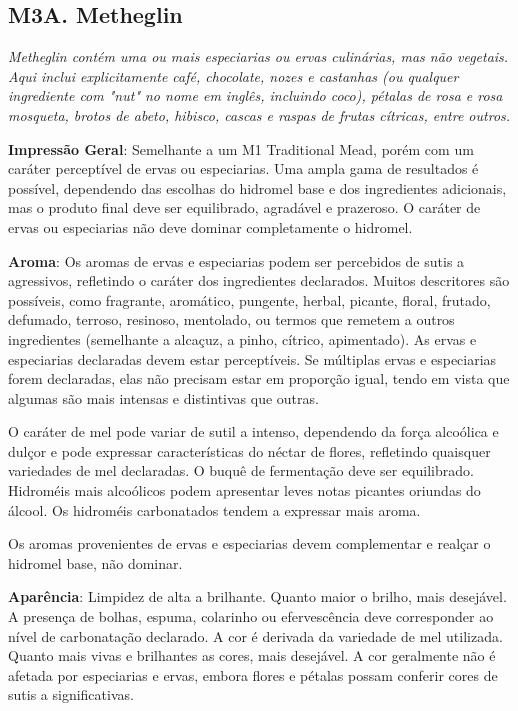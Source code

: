 \subsection*{M3A. Metheglin}

\textit{Metheglin contém uma ou mais especiarias ou ervas culinárias, mas não vegetais. Aqui inclui explicitamente café, chocolate, nozes e castanhas (ou qualquer ingrediente com "nut" no nome em inglês, incluindo coco), pétalas de rosa e rosa mosqueta, brotos de abeto, hibisco, cascas e raspas de frutas cítricas, entre outros.}

\textbf{Impressão Geral}: Semelhante a um M1 Traditional Mead, porém com um caráter perceptível de ervas ou especiarias. Uma ampla gama de resultados é possível, dependendo das escolhas do hidromel base e dos ingredientes adicionais, mas o produto final deve ser equilibrado, agradável e prazeroso. O caráter de ervas ou especiarias não deve dominar completamente o hidromel.

\textbf{Aroma}: Os aromas de ervas e especiarias podem ser percebidos de sutis a agressivos, refletindo o caráter dos ingredientes declarados. Muitos descritores são possíveis, como fragrante, aromático, pungente, herbal, picante, floral, frutado, defumado, terroso, resinoso, mentolado, ou termos que remetem a outros ingredientes (semelhante a alcaçuz, a pinho, cítrico, apimentado). As ervas e especiarias declaradas devem estar perceptíveis. Se múltiplas ervas e especiarias forem declaradas, elas não precisam estar em proporção igual, tendo em vista que algumas são mais intensas e distintivas que outras.

O caráter de mel pode variar de sutil a intenso, dependendo da força alcoólica e dulçor e pode expressar características do néctar de flores, refletindo quaisquer variedades de mel declaradas. O buquê de fermentação deve ser equilibrado. Hidroméis mais alcoólicos podem apresentar leves notas picantes oriundas do álcool. Os hidroméis carbonatados tendem a expressar mais aroma.

Os aromas provenientes de ervas e especiarias devem complementar e realçar o hidromel base, não dominar.

\textbf{Aparência}: Limpidez de alta a brilhante. Quanto maior o brilho, mais desejável. A presença de bolhas, espuma, colarinho ou efervescência deve corresponder ao nível de carbonatação declarado. A cor é derivada da variedade de mel utilizada. Quanto mais vivas e brilhantes as cores, mais desejável. A cor geralmente não é afetada por especiarias e ervas, embora flores e pétalas possam conferir cores de sutis a significativas.

